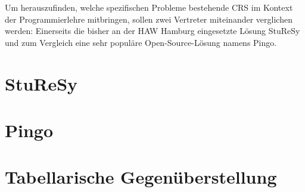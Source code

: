Um herauszufinden, welche spezifischen Probleme bestehende CRS im Kontext der Programmierlehre mitbringen, sollen zwei Vertreter miteinander verglichen werden: Einerseits die bisher an der HAW Hamburg eingesetzte Lösung StuReSy und zum Vergleich eine sehr populäre Open-Source-Lösung namens Pingo.

\section{StuReSy}
\label{chap:sturesy}

%
\section{Pingo}
\label{chap:pingo}

%
\section{Tabellarische Gegenüberstellung}
\label{chap:tabelle}
